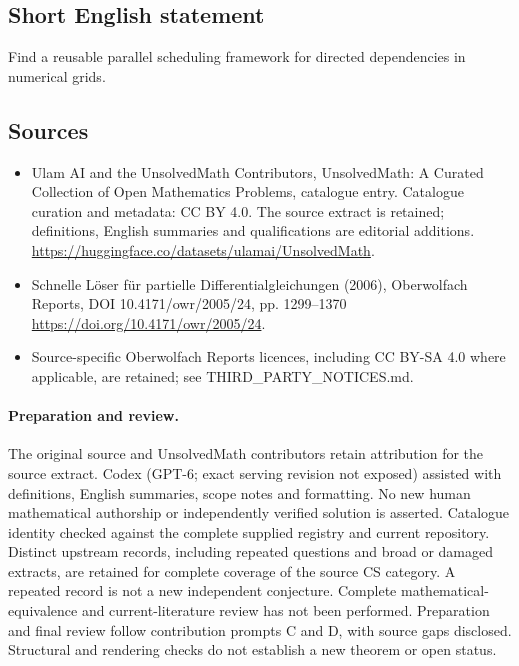 \documentclass[11pt]{article}
\begin{document}
\subsection{Short English statement}
Find a reusable parallel scheduling framework for directed dependencies in numerical grids.
\subsection{Sources}
\begin{itemize}
\item[\hypertarget{source:statement:1}{S1}] Ulam AI and the UnsolvedMath Contributors, UnsolvedMath: A Curated Collection of Open Mathematics Problems, catalogue entry. Catalogue curation and metadata: CC BY 4.0. The source extract is retained; definitions, English summaries and qualifications are editorial additions.
\url{https://huggingface.co/datasets/ulamai/UnsolvedMath}.
\item[\hypertarget{source:statement:2}{S2}] Schnelle Löser für partielle Differentialgleichungen (2006), Oberwolfach Reports, DOI 10.4171/owr/2005/24, pp. 1299--1370
\url{https://doi.org/10.4171/owr/2005/24}.
\item Source-specific Oberwolfach Reports licences, including CC BY-SA 4.0 where applicable, are retained; see THIRD\_PARTY\_NOTICES.md.
\end{itemize}
\paragraph{Preparation and review.}
The original source and UnsolvedMath contributors retain attribution for the source extract. Codex (GPT-6; exact serving revision not exposed) assisted with definitions, English summaries, scope notes and formatting. No new human mathematical authorship or independently verified solution is asserted. Catalogue identity checked against the complete supplied registry and current repository. Distinct upstream records, including repeated questions and broad or damaged extracts, are retained for complete coverage of the source CS category. A repeated record is not a new independent conjecture. Complete mathematical-equivalence and current-literature review has not been performed. Preparation and final review follow contribution prompts C and D, with source gaps disclosed. Structural and rendering checks do not establish a new theorem or open status.
\label{end:statement}
\end{document}

